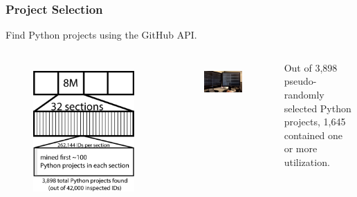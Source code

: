 

\begin{frame}
\frametitle{Project Selection}
\begin{center}
Find Python projects using the GitHub API.
\end{center}
\begin{columns}[t]
\begin{figure}[ht]
  \includegraphics[scale=0.16]{nontex/illustrations/32Divided.eps}
  \label{fig:32Divided}
\end{figure}
\begin{figure}[ht]
  \includegraphics[width=\linewidth]{nontex/smallScrapersPNG/smallScrapers-112}
    \label{fig:scraper}
\end{figure}
Out of 3,898 pseudo-randomly selected Python projects, 1,645 contained one or more utilization.
\end{columns}
\end{frame}
